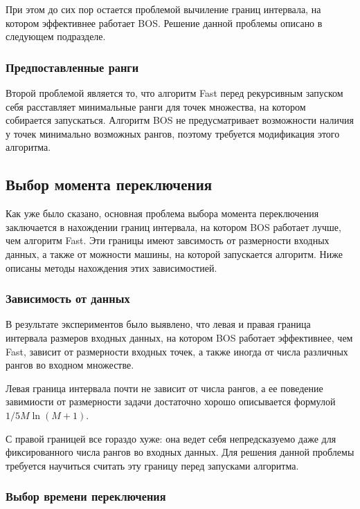 При этом до сих пор остается проблемой вычиление границ интервала, на котором эффективнее работает BOS. Решение
данной проблемы описано в следующем подразделе.

\subsubsection{Предпоставленные ранги}

Второй проблемой является то, что алгоритм Fast перед рекурсивным запуском себя расставляет минимальные ранги для
точек множества, на котором собирается запускаться. Алгоритм BOS не предусматривает возможности наличия у точек
минимально возможных рангов, поэтому требуется модификация этого алгоритма.

\subsection{Выбор момента переключения}

Как уже было сказано, основная проблема выбора момента переключения заключается в нахождении границ интервала, на
котором BOS работает лучше, чем алгоритм Fast. Эти границы имеют завсимость от размерности входных данных, а также
от можности машины, на которой запускается алгоритм. Ниже описаны методы нахождения этих зависимостией.

\subsubsection{Зависимость от данных}

В результате экспериментов было выявлено, что левая и правая граница интервала размеров входных данных, на
котором BOS  работает эффективнее, чем Fast, зависит от размерности входных точек, а также иногда от числа различных
рангов во входном множестве.

Левая граница интервала почти не зависит от числа рангов, а ее поведение завимиости от размерности задачи достаточно
хорошо описывается формулой $1/5 M \ln (M + 1)$.

С правой границей все гораздо хуже: она ведет себя непредсказуемо даже для фиксированного числа рангов во входных
данных. Для решения данной проблемы требуется научиться считать эту границу перед запусками алгоритма.

\subsubsection{Выбор времени переключения}

